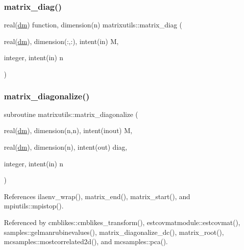 \subsubsection{\texorpdfstring{matrix\+\_\+diag()}{matrix\_diag()}}
{\footnotesize\ttfamily real(\mbox{\hyperlink{namespacematrixutils_a7bdc564986ea4d90f51201c75606ef3d}{dm}}) function, dimension(n) matrixutils\+::matrix\+\_\+diag (\begin{DoxyParamCaption}\item[{real(\mbox{\hyperlink{namespacematrixutils_a7bdc564986ea4d90f51201c75606ef3d}{dm}}), dimension(\+:,\+:), intent(in)}]{M,  }\item[{integer, intent(in)}]{n }\end{DoxyParamCaption})}

\mbox{\label{namespacematrixutils_aa94ed3ad0cf6b18002c5f8ca9cd8b948}} 
\subsubsection{\texorpdfstring{matrix\+\_\+diagonalize()}{matrix\_diagonalize()}}
{\footnotesize\ttfamily subroutine matrixutils\+::matrix\+\_\+diagonalize (\begin{DoxyParamCaption}\item[{real(\mbox{\hyperlink{namespacematrixutils_a7bdc564986ea4d90f51201c75606ef3d}{dm}}), dimension(n,n), intent(inout)}]{M,  }\item[{real(\mbox{\hyperlink{namespacematrixutils_a7bdc564986ea4d90f51201c75606ef3d}{dm}}), dimension(n), intent(out)}]{diag,  }\item[{integer, intent(in)}]{n }\end{DoxyParamCaption})}



References ilaenv\+\_\+wrap(), matrix\+\_\+end(), matrix\+\_\+start(), and mpiutils\+::mpistop().



Referenced by cmblikes\+::cmblikes\+\_\+transform(), estcovmatmodule\+::estcovmat(), samples\+::gelmanrubinevalues(), matrix\+\_\+diagonalize\+\_\+dc(), matrix\+\_\+root(), mcsamples\+::mostcorrelated2d(), and mcsamples\+::pca().

